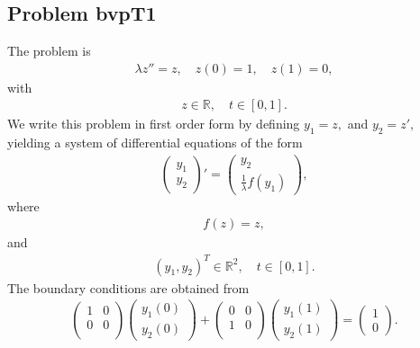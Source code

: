 \documentclass[<options>]{article}
\begin{document}
\subsection{Problem bvpT1}\label{test1}
The problem is 
\begin{equation*}
\begin{matrix}
\lambda z'' =z, \quad z(0)=1, \quad z(1)=0,
\end{matrix}
\end{equation*}
with
\begin{equation*}
\begin{matrix}
z \in \mathbb{R}, \quad  t\in [0,1].
\end{matrix}
\end{equation*}
We write this problem in first order form by defining $y_1=z,$ and $y_2=z',$ yielding a system of differential equations of the form
\begin{equation*}
\begin{matrix}
\left(\begin{matrix}
y_1\\
y_2
\end{matrix}\right)'=
\left(\begin{matrix}
y_2\\
\frac{1}{\lambda}f(y_1)
\end{matrix}\right),
\end{matrix}
\end{equation*}
where
\begin{equation*}
\begin{matrix}
f(z)= z,
\end{matrix}
\end{equation*}
and
\begin{equation*}
\begin{matrix}
(y_1,y_2)^T \in \mathbb{R}^{2}, \quad  t \in [0,1].
\end{matrix}
\end{equation*}
The boundary conditions are obtained from
\begin{equation*}
\begin{matrix}
\left(
  \begin{matrix}
    1 & 0 \\
    0 & 0 \\
  \end{matrix}
\right)
\left(\begin{matrix}
y_{1}(0)\\
y_{2}(0)
\end{matrix}\right)
+
\left(
  \begin{matrix}
    0 & 0 \\
    1 & 0 \\
  \end{matrix}
\right)
\left(\begin{matrix}
y_{1}(1)\\
y_{2}(1)
\end{matrix}\right)=\left(\begin{matrix}
1 \\
0
\end{matrix}\right).
\end{matrix}
\end{equation*}
\end{document}
